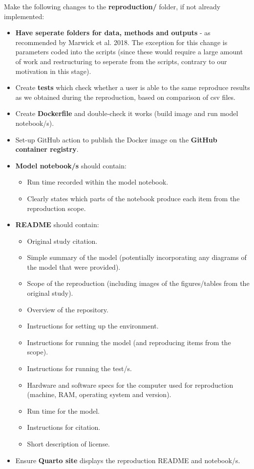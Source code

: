 Make the following changes to the \textbf{reproduction/} folder, if not already implemented:
\begin{itemize}
    \item \textbf{Have seperate folders for data, methods and outputs} - as recommended by Marwick et al. 2018\autocite{marwick_packaging_2018}. The exception for this change is parameters coded into the scripts (since these would require a large amount of work and restructuring to seperate from the scripts, contrary to our motivation in this stage).
    \item Create \textbf{tests} which check whether a user is able to the same reproduce results as we obtained during the reproduction, based on comparison of csv files.
    \item Create \textbf{Dockerfile} and double-check it works (build image and run model notebook/s).
    \item Set-up GitHub action to publish the Docker image on the \textbf{GitHub container registry}.
    \item \textbf{Model notebook/s} should contain:
    \begin{itemize}
        \item Run time recorded within the model notebook.
        \item Clearly states which parts of the notebook produce each item from the reproduction scope.
    \end{itemize}
    \item \textbf{README} should contain:
    \begin{itemize}
        \item Original study citation.
        \item Simple summary of the model (potentially incorporating any diagrams of the model that were provided).
        \item Scope of the reproduction (including images of the figures/tables from the original study).
        \item Overview of the repository.
        \item Instructions for setting up the environment.
        \item Instructions for running the model (and reproducing items from the scope).
        \item Instructions for running the test/s.
        \item Hardware and software specs for the computer used for reproduction (machine, RAM, operating system and version).
        \item Run time for the model.
        \item Instructions for citation.
        \item Short description of license.
    \end{itemize}
    \item Ensure \textbf{Quarto site} displays the reproduction README and notebook/s.
\end{itemize}

